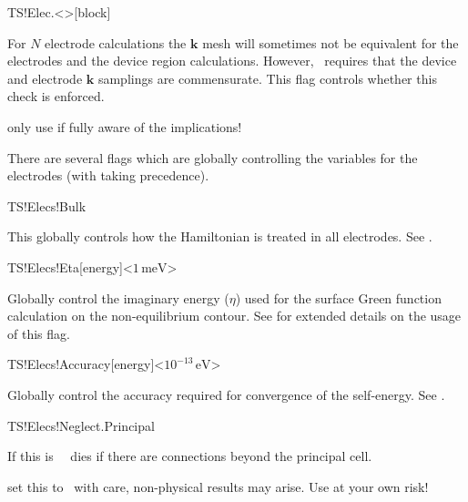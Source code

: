\begin{fdfentry}{TS!Elec.<>}[block]
\begin{fdfoptions}
    For $N$ electrode calculations the $\mathbf k$ mesh will sometimes
    not be equivalent for the electrodes and the device region
    calculations. However, \tsiesta\ requires that the device and
    electrode $\mathbf k$ samplings are commensurate. This flag
    controls whether this check is enforced.

    \note only use if fully aware of the implications!

  \end{fdfoptions}
  
\end{fdfentry}

There are several flags which are globally controlling the variables
for the electrodes (with  taking precedence).

\begin{fdflogicalT}{TS!Elecs!Bulk}

  This globally controls how the Hamiltonian is treated in all
  electrodes. 
  See .
  
\end{fdflogicalT}

\begin{fdfentry}{TS!Elecs!Eta}[energy]<$1\,\mathrm{meV}$>
  
  Globally control the imaginary energy ($\eta$) used for the surface
  Green function calculation on the non-equilibrium contour.
  See  for extended details on the usage of this
  flag. 
  
\end{fdfentry}

\begin{fdfentry}{TS!Elecs!Accuracy}[energy]<$10^{-13}\,\mathrm{eV}$>
  
  Globally control the accuracy required for convergence of the self-energy.
  See .
  
\end{fdfentry}

\begin{fdflogicalF}{TS!Elecs!Neglect.Principal}
  
  If this is \fdffalse\ \tsiesta\ dies if there are connections beyond
  the principal cell.

  \note set this to \fdftrue\ with care, non-physical results may
  arise. Use at your own risk!

\end{fdflogicalF}  

